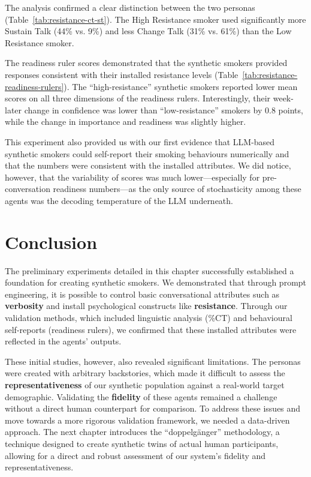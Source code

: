 The analysis confirmed a clear distinction between the two personas (Table~\ref{tab:resistance-ct-st}). The High Resistance smoker used significantly more Sustain Talk (44\% vs. 9\%) and less Change Talk (31\% vs. 61\%) than the Low Resistance smoker.


The readiness ruler scores demonstrated that the synthetic smokers provided responses consistent with their installed resistance levels (Table~\ref{tab:resistance-readiness-rulers}). The ``high-resistance'' synthetic smokers reported lower mean scores on all three dimensions of the readiness rulers. Interestingly, their week-later change in confidence was lower than ``low-resistance'' smokers by 0.8 points, while the change in importance and readiness was slightly higher.




This experiment also provided us with our first evidence that LLM-based synthetic smokers could self-report their smoking behaviours numerically and that the numbers were consistent with the installed attributes. We did notice, however, that the variability of scores was much lower---especially for pre-conversation readiness numbers---as the only source of stochasticity among these agents was the decoding temperature of the LLM underneath.



\section{Conclusion}
\label{sec:prelim-conclusion}

The preliminary experiments detailed in this chapter successfully established a foundation for creating synthetic smokers. We demonstrated that through prompt engineering, it is possible to control basic conversational attributes such as \textbf{verbosity} and install psychological constructs like \textbf{resistance}. Through our validation methods, which included linguistic analysis (\%CT) and behavioural self-reports (readiness rulers), we confirmed that these installed attributes were reflected in the agents' outputs.

These initial studies, however, also revealed significant limitations. The personas were created with arbitrary backstories, which made it difficult to assess the \textbf{representativeness} of our synthetic population against a real-world target demographic. Validating the \textbf{fidelity} of these agents remained a challenge without a direct human counterpart for comparison. To address these issues and move towards a more rigorous validation framework, we needed a data-driven approach. The next chapter introduces the ``doppelgänger'' methodology, a technique designed to create synthetic twins of actual human participants, allowing for a direct and robust assessment of our system's fidelity and representativeness.